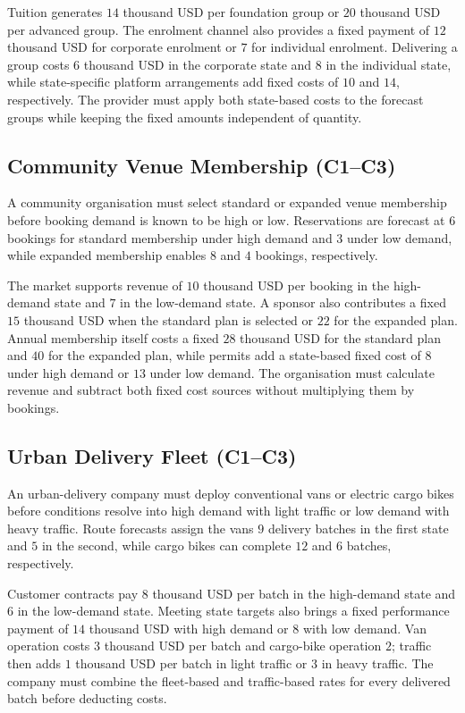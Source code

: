 	Tuition generates \(14\) thousand USD per foundation group or \(20\) thousand USD per advanced group. The enrolment channel also provides a fixed payment of \(12\) thousand USD for corporate enrolment or \(7\) for individual enrolment. Delivering a group costs \(6\) thousand USD in the corporate state and \(8\) in the individual state, while state-specific platform arrangements add fixed costs of \(10\) and \(14\), respectively. The provider must apply both state-based costs to the forecast groups while keeping the fixed amounts independent of quantity.

	\subsection{Community Venue Membership (C1--C3)}
	\label{sec:problem12-community-venue-membership-c1-c3}

	A community organisation must select standard or expanded venue membership before booking demand is known to be high or low. Reservations are forecast at \(6\) bookings for standard membership under high demand and \(3\) under low demand, while expanded membership enables \(8\) and \(4\) bookings, respectively.

	The market supports revenue of \(10\) thousand USD per booking in the high-demand state and \(7\) in the low-demand state. A sponsor also contributes a fixed \(15\) thousand USD when the standard plan is selected or \(22\) for the expanded plan. Annual membership itself costs a fixed \(28\) thousand USD for the standard plan and \(40\) for the expanded plan, while permits add a state-based fixed cost of \(8\) under high demand or \(13\) under low demand. The organisation must calculate revenue and subtract both fixed cost sources without multiplying them by bookings.

	\subsection{Urban Delivery Fleet (C1--C3)}
	\label{sec:problem13-urban-delivery-fleet-c1-c3}

	An urban-delivery company must deploy conventional vans or electric cargo bikes before conditions resolve into high demand with light traffic or low demand with heavy traffic. Route forecasts assign the vans \(9\) delivery batches in the first state and \(5\) in the second, while cargo bikes can complete \(12\) and \(6\) batches, respectively.

	Customer contracts pay \(8\) thousand USD per batch in the high-demand state and \(6\) in the low-demand state. Meeting state targets also brings a fixed performance payment of \(14\) thousand USD with high demand or \(8\) with low demand. Van operation costs \(3\) thousand USD per batch and cargo-bike operation \(2\); traffic then adds \(1\) thousand USD per batch in light traffic or \(3\) in heavy traffic. The company must combine the fleet-based and traffic-based rates for every delivered batch before deducting costs.

